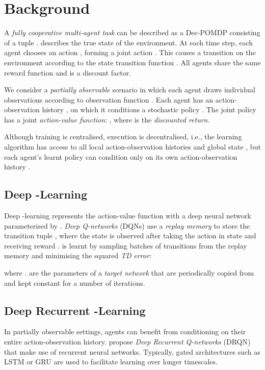 \documentclass{article}
\begin{document}
 \section{Background}
\label{sec:background}


A \textit{fully cooperative multi-agent task} can be described as a Dec-POMDP \cite{oliehoek_concise_2016} consisting of a tuple . 
 describes the true state of the environment.
At each time step, each agent  chooses an action , forming a joint action . 
This causes a transition on the environment according to the state transition function . 
All agents share the same reward function  and  is a discount factor. 

We consider a \textit{partially observable} scenario in which each agent draws individual observations  according to observation function . 
Each agent has an action-observation history , on which it conditions a stochastic policy . The joint policy  has a joint \textit{action-value function}: , where  is the \textit{discounted return}.


Although training is centralised, execution is decentralised, i.e., the 
learning algorithm has access to all local action-observation histories 
 and global state , but each agent's learnt policy can 
condition only on its own action-observation history .

\subsection{Deep -Learning}

Deep -learning represents the action-value function with a deep neural network parameterised by . \textit{Deep Q-networks} (DQNs) \cite{mnih_human-level_2015} use a  \textit{replay memory} to store the transition tuple , where the state    is observed after taking the action  in state  and receiving reward .  is learnt by sampling batches of  transitions from the replay memory and minimising the squared \textit{TD error}:
 
where .  are the parameters of a \textit{target network} that are periodically copied from  and kept constant for a number of iterations.  

\subsection{Deep Recurrent -Learning}

In partially observable settings, agents can benefit from conditioning on their entire action-observation history. \citet{hausknecht_deep_2015} propose \textit{Deep Recurrent Q-networks} (DRQN) that make use of recurrent neural networks. Typically, gated architectures such as LSTM \cite{hochreiter_long_1997} or GRU \cite{chung_empirical_2014} are used to facilitate learning over longer timescales.
\end{document}
